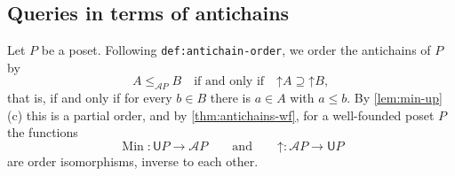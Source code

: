 \documentclass[11pt,a4paper]{article}
\theoremstyle{plain}
\theoremstyle{definition}
\theoremstyle{remark}
\newcommand{\U}{\mathsf{U}}
\newcommand{\An}{\mathcal{A}}
\newcommand{\up}{\mathord{\uparrow}}
\DeclareMathOperator{\Min}{Min}
\newcommand{\lbl}[1]{\nolinkurl{#1}}
\begin{document}
\subsection{Queries in terms of antichains}

Let $P$ be a poset.
Following \lbl{def:antichain-order}, we order the antichains of $P$ by
\begin{equation}
    \label{eq:antichain-order}
    A \leq_{\An P} B
    \quad \text{if and only if} \quad
    \up A \supseteq \up B,
\end{equation}
that is, if and only if for every $b \in B$ there is $a \in A$ with $a \leq b$.
By \cref{lem:min-up}(c) this is a partial order, and by \cref{thm:antichains-wf}, for a well-founded poset $P$ the functions
\begin{equation}
    \label{eq:min-up-iso}
    \Min \colon \U P \to \An P
    \qquad \text{and} \qquad
    \up \colon \An P \to \U P
\end{equation}
are order isomorphisms, inverse to each other.
\end{document}
